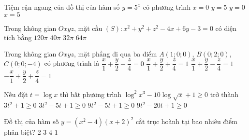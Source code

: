 \begin{ex}%
Tiệm cận ngang của đồ thị của hàm số $y=5^x$ có phương trình
\choice
{$x=0$}
{$y=5$}
{\True $y=0$}
{$x=5$}
\end{ex}

\begin{ex}%
Trong không gian $Oxyz$, mặt cầu $(S)\colon x^2+y^2+z^2-4x+6y-3=0$ có diện tích bằng
\choice
{$120 \pi$}
{$40 \pi$}
{$32 \pi$}
{\True $64 \pi$}
\end{ex}

\begin{ex}%
Trong không gian $Oxyz$, mặt phẳng đi qua ba điểm $A(1; 0; 0)$, $B(0; 2; 0)$, $C(0; 0;-4)$ có phương trình là
\choice
{$\dfrac{x}{1}+\dfrac{y}{2}-\dfrac{z}{4}=0$}
{$\dfrac{x}{1}+\dfrac{y}{2}+\dfrac{z}{4}=1$}
{\True $\dfrac{x}{1}+\dfrac{y}{2}-\dfrac{z}{4}=1$}
{$-\dfrac{x}{1}+\dfrac{y}{2}+\dfrac{z}{4}=1$}
\end{ex}

\begin{ex}%
Nếu đặt $t=\log x$ thì bất phương trình $\log^2x^3-10\log\sqrt{x}+1\ge 0$ trở thành
\choice
{$3t^2+1 \ge 0$}
{$3t^2-5t+1 \ge 0$}
{\True $9t^2-5t+1 \ge 0$}
{$9t^2-20t+1 \ge 0$}
\end{ex}

\begin{ex}%
Đồ thị của hàm số $y=\left(x^2-4\right)(x+2)^2$ cắt trục hoành tại bao nhiêu điểm phân biệt?
\choice
{\True $2$}
{$3$}
{$4$}
{$1$}
\end{ex}

